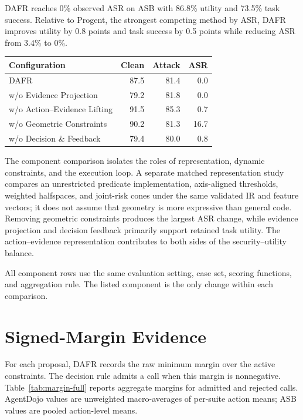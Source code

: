 \documentclass[letterpaper]{article}
\begin{document}
DAFR reaches 0\% observed ASR on ASB with 86.8\% utility and 73.5\% task success. Relative to Progent, the strongest competing method by ASR, DAFR improves utility by 0.8 points and task success by 0.5 points while reducing ASR from 3.4\% to 0\%.

\begin{center}
\small
\begin{tabular}{lrrr}
\toprule
Configuration & Clean & Attack & ASR\\
\midrule
DAFR & 87.5 & 81.4 & 0.0\\
w/o Evidence Projection & 79.2 & 81.8 & 0.0\\
w/o Action--Evidence Lifting & 91.5 & 85.3 & 0.7\\
w/o Geometric Constraints & 90.2 & 81.3 & 16.7\\
w/o Decision \& Feedback & 79.4 & 80.0 & 0.8\\
\bottomrule
\end{tabular}
\label{tab:ablation-full}
\end{center}

The component comparison isolates the roles of representation, dynamic constraints, and the execution loop. A separate matched representation study compares an unrestricted predicate implementation, axis-aligned thresholds, weighted halfspaces, and joint-risk cones under the same validated IR and feature vectors; it does not assume that geometry is more expressive than general code. Removing geometric constraints produces the largest ASR change, while evidence projection and decision feedback primarily support retained task utility. The action--evidence representation contributes to both sides of the security--utility balance.

All component rows use the same evaluation setting, case set, scoring functions, and aggregation rule. The listed component is the only change within each comparison.

\section{Signed-Margin Evidence}

For each proposal, DAFR records the raw minimum margin over the active constraints. The decision rule admits a call when this margin is nonnegative. Table~\ref{tab:margin-full} reports aggregate margins for admitted and rejected calls. AgentDojo values are unweighted macro-averages of per-suite action means; ASB values are pooled action-level means.
\end{document}
